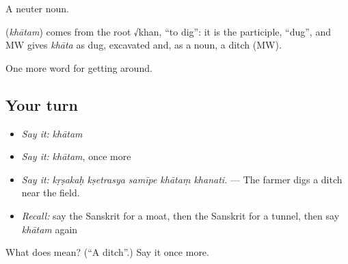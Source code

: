 A neuter noun.

\begin{cousinweb}
\textbf{} (\emph{khātam}) comes from the root √khan, \textquotedblleft{}to dig\textquotedblright{}: it is the participle, \textquotedblleft{}dug\textquotedblright{}, and MW gives \emph{khāta} as dug, excavated and, as a noun, a ditch (MW).
\end{cousinweb}

\begin{grammarlens}[title={What you've built}]
One more word for getting around.
\end{grammarlens}

\subsection*{Your turn}
\begin{itemize}
\raggedright
  \item \emph{Say it:} \emph{khātam}
  \item \emph{Say it:} \emph{khātam}, once more
  \item \emph{Say it:} \emph{kṛṣakaḥ kṣetrasya samīpe khātaṃ khanati.} — The farmer digs a ditch near the field.
  \item \emph{Recall:} say the Sanskrit for a moat, then the Sanskrit for a tunnel, then say \emph{khātam} again
\end{itemize}

\begin{tcolorbox}[breakable,colback=teal!4,colframe=teal!35!black,title={Before you move on}]
What does  mean? (\textquotedblleft{}A ditch\textquotedblright{}.) Say it once more.
\end{tcolorbox}
